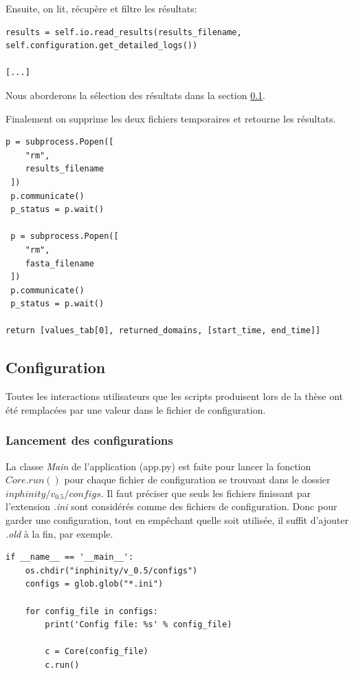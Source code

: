Ensuite, on lit, récupère et filtre les résultats:

\begin{lstlisting}[frame=single]
results = self.io.read_results(results_filename, self.configuration.get_detailed_logs())

[...]
\end{lstlisting}

Nous aborderons la sélection des résultats dans la section \ref{ch:config}.

Finalement on supprime les deux fichiers temporaires et  retourne les résultats.

\begin{lstlisting}[frame=single]
p = subprocess.Popen([
	"rm",
	results_filename
 ])
 p.communicate()
 p_status = p.wait()

 p = subprocess.Popen([
 	"rm",
 	fasta_filename
 ])
 p.communicate()
 p_status = p.wait()

return [values_tab[0], returned_domains, [start_time, end_time]]
\end{lstlisting}

\subsection{Configuration}
\label{ch:config}

Toutes les interactions utilisateurs que les scripts produisent lors de la thèse \thLeite ont été remplacées par une valeur dans le fichier de configuration.

\subsubsection{Lancement des configurations}

La classe \emph{Main} de l'application (app.py) est faite pour lancer la fonction \emph{$Core.run()$} pour chaque fichier de configuration se trouvant dans le dossier \emph{$inphinity/v_0.5/configs$}. Il faut préciser que seuls les fichiers finissant par l'extension \emph{.ini} sont considérés comme des fichiers de configuration. Donc pour garder une configuration, tout en empêchant quelle soit utilisée, il suffit d'ajouter \emph{.old} à la fin, par exemple.

\begin{lstlisting}[frame=single]
if __name__ == '__main__':
    os.chdir("inphinity/v_0.5/configs")
    configs = glob.glob("*.ini")

    for config_file in configs:
        print('Config file: %s' % config_file)

        c = Core(config_file)
        c.run()
\end{lstlisting}

